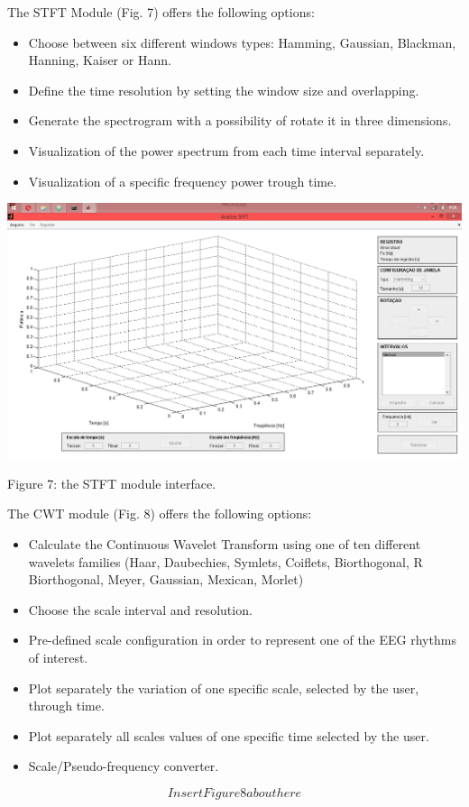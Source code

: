 \documentclass[12pt, a4paper]{article}
\begin{document}
The STFT Module (Fig. 7) offers the following options:
\begin{itemize}
\item Choose between six different windows types: Hamming, Gaussian, Blackman, Hanning, Kaiser or Hann.
\item Define the time resolution by setting the window size and overlapping. 
\item Generate the spectrogram with a possibility of rotate it in three dimensions. 
\item Visualization of the power spectrum from each time interval separately.
\item Visualization of a specific frequency power trough time.
\end{itemize}
\begin{center}
\includegraphics[width=15cm]{stft1.png}

Figure 7: the STFT module interface.
\end{center}


The CWT module (Fig. 8) offers the following options:
\begin{itemize}
\item Calculate the Continuous Wavelet Transform using one of ten different wavelets families (Haar, Daubechies, Symlets, Coiflets, Biorthogonal, R Biorthogonal, Meyer, Gaussian, Mexican, Morlet)
\item Choose the scale interval and resolution.
\item Pre-defined scale configuration in order to represent one of the EEG rhythms of interest. 
\item Plot separately the variation of one specific scale, selected by the user, through time.
\item Plot separately all scales values of one specific time selected by the user.
\item Scale/Pseudo-frequency converter.
\end{itemize}
$$Insert Figure 8 about here$$
\end{document}
